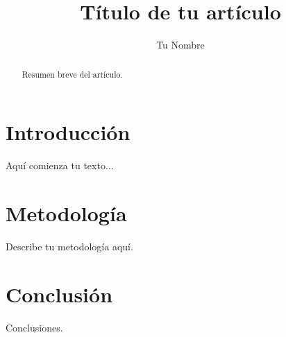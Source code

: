 \documentclass[man,12pt]{apa7}
\title{Título de tu artículo}
\author{Tu Nombre}
\affiliation{Tu Institución}
\begin{document}
\maketitle

\begin{abstract}
Resumen breve del artículo.
\end{abstract}

\section{Introducción}

Aquí comienza tu texto...

\section{Metodología}

Describe tu metodología aquí.

\section{Conclusión}

Conclusiones.

\printbibliography
\end{document}
